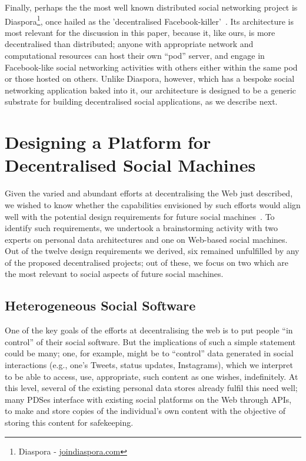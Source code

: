 \documentclass{sig-alternate}
\begin{document}
Finally, perhaps the the most well known distributed social networking project is Diaspora\footnote{Diaspora - \url{joindiaspora.com}}, once hailed as the 'decentralised Facebook-killer'~\cite{verge}.  Its architecture is most relevant for the discussion in this paper, because it, like ours, is more decentralised than distributed; anyone with appropriate network and computational resources can host their own ``pod'' server, and engage in Facebook-like social networking activities with others either within the same pod or those hosted on others.  Unlike Diaspora, however, which has a bespoke social networking application baked into it, our architecture is designed to be a generic substrate for building decentralised social applications, as we describe next.

\section{Designing a Platform for Decentralised Social Machines}

Given the varied and abundant efforts at decentralising the Web just described, we wished to know whether the capabilities envisioned by such efforts would align well with the potential design requirements for future social machines~\cite{hendler2010semantic}.  To identify such requirements, we undertook a brainstorming activity with two experts on personal data architectures and one on Web-based social machines.  Out of the twelve design requirements we derived, six remained unfulfilled by any of the proposed decentralised projects; out of these, we focus on two which are the most relevant to social aspects of future social machines.

\subsection{Heterogeneous Social Software}

One of the key goals of the efforts at decentralising the web is to put people ``in control'' of their social software. But the implications of such a simple statement could be many; one, for example, might be to ``control'' data generated in social interactions (e.g., one's Tweets, status updates, Instagrams), which we interpret to be able to access, use, appropriate, such content as one wishes, indefinitely.  At this level, several of the existing personal data stores already fulfil this need well; many PDSes interface with existing social platforms on the Web through APIs, to make and store copies of the individual's own content with the objective of storing this content for safekeeping.
\end{document}
